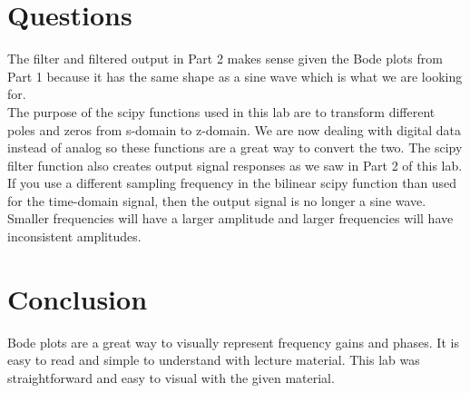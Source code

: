 \documentclass[12pt]{report}
\begin{document}
\section{Questions}
The filter and filtered output in Part 2 makes sense given the Bode plots from Part 1 because it has the same shape as a sine wave which is what we are looking for. \\

\noindent The purpose of the scipy functions used in this lab are to transform different poles and zeros from s-domain to z-domain. We are now dealing with digital data instead of analog so these functions are a great way to convert the two. The scipy filter function also creates output signal responses as we saw in Part 2 of this lab. \\

\noindent If you use a different sampling frequency in the bilinear scipy function than used for the time-domain signal, then the output signal is no longer a sine wave. Smaller frequencies will have a larger amplitude and larger frequencies will have inconsistent amplitudes. 

\section{Conclusion}
Bode plots are a great way to visually represent frequency gains and phases. It is easy to read and simple to understand with lecture material. This lab was straightforward and easy to visual with the given material. 
\end{document}
